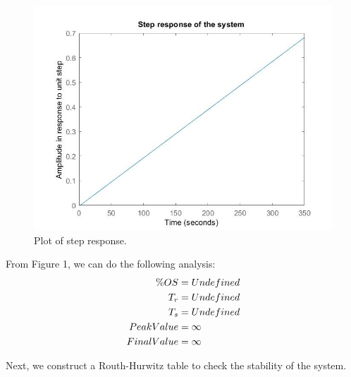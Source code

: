 \documentclass{article}
\begin{document}
\begin{figure}[h!]
\centering
\includegraphics[scale=0.5]{Step_Response.jpg}
\caption{Plot of step response.}
\end{figure}

From Figure 1, we can do the following analysis: \\
\begin{equation}\begin{aligned}
\%OS & = Undefined\\
T_r & = Undefined\\
T_s & = Undefined\\
Peak Value & = \infty \\
Final Value & = \infty\end{aligned} \notag \end{equation}

\vskip120pt
\noindent Next, we construct a Routh-Hurwitz table to check the stability of the system.
\begin{table}[h] \begin{center}
\end{center}
\end{table}
\end{document}
